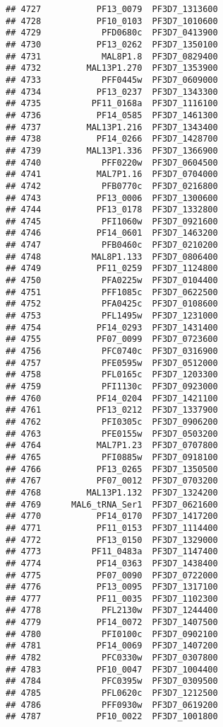 \documentclass[12pt, a4paper]{article}\usepackage[]{graphicx}\usepackage[]{color}
\makeatletter
\newenvironment{kframe}{%
 \def\at@end@of@kframe{}%
 \ifinner\ifhmode%
  \def\at@end@of@kframe{\end{minipage}}%
  \begin{minipage}{\columnwidth}%
 \fi\fi%
 \def\FrameCommand##1{\hskip\@totalleftmargin \hskip-\fboxsep
 \colorbox{shadecolor}{##1}\hskip-\fboxsep
     \hskip-\linewidth \hskip-\@totalleftmargin \hskip\columnwidth}%
 \MakeFramed {\advance\hsize-\width
   \@totalleftmargin\z@ \linewidth\hsize
   \@setminipage}}%
 {\par\unskip\endMakeFramed%
 \at@end@of@kframe}
\newenvironment{knitrout}{}{} %
\makeatother
\begin{document}
\begin{knitrout}
\begin{kframe}
\begin{verbatim}
## 4727           PF13_0079  PF3D7_1313600
## 4728           PF10_0103  PF3D7_1010600
## 4729            PFD0680c  PF3D7_0413900
## 4730           PF13_0262  PF3D7_1350100
## 4731            MAL8P1.8  PF3D7_0829400
## 4732         MAL13P1.270  PF3D7_1353900
## 4733            PFF0445w  PF3D7_0609000
## 4734           PF13_0237  PF3D7_1343300
## 4735          PF11_0168a  PF3D7_1116100
## 4736           PF14_0585  PF3D7_1461300
## 4737         MAL13P1.216  PF3D7_1343400
## 4738           PF14_0266  PF3D7_1428700
## 4739         MAL13P1.336  PF3D7_1366900
## 4740            PFF0220w  PF3D7_0604500
## 4741           MAL7P1.16  PF3D7_0704000
## 4742            PFB0770c  PF3D7_0216800
## 4743           PF13_0006  PF3D7_1300600
## 4744           PF13_0178  PF3D7_1332800
## 4745            PFI1060w  PF3D7_0921600
## 4746           PF14_0601  PF3D7_1463200
## 4747            PFB0460c  PF3D7_0210200
## 4748          MAL8P1.133  PF3D7_0806400
## 4749           PF11_0259  PF3D7_1124800
## 4750            PFA0225w  PF3D7_0104400
## 4751            PFF1085c  PF3D7_0622500
## 4752            PFA0425c  PF3D7_0108600
## 4753            PFL1495w  PF3D7_1231000
## 4754           PF14_0293  PF3D7_1431400
## 4755           PF07_0099  PF3D7_0723600
## 4756            PFC0740c  PF3D7_0316900
## 4757            PFE0595w  PF3D7_0512000
## 4758            PFL0165c  PF3D7_1203300
## 4759            PFI1130c  PF3D7_0923000
## 4760           PF14_0204  PF3D7_1421100
## 4761           PF13_0212  PF3D7_1337900
## 4762            PFI0305c  PF3D7_0906200
## 4763            PFE0155w  PF3D7_0503200
## 4764           MAL7P1.23  PF3D7_0707800
## 4765            PFI0885w  PF3D7_0918100
## 4766           PF13_0265  PF3D7_1350500
## 4767           PF07_0012  PF3D7_0703200
## 4768         MAL13P1.132  PF3D7_1324200
## 4769      MAL6_tRNA_Ser1  PF3D7_0621600
## 4770           PF14_0170  PF3D7_1417200
## 4771           PF11_0153  PF3D7_1114400
## 4772           PF13_0150  PF3D7_1329000
## 4773          PF11_0483a  PF3D7_1147400
## 4774           PF14_0363  PF3D7_1438400
## 4775           PF07_0090  PF3D7_0722000
## 4776           PF13_0095  PF3D7_1317100
## 4777           PF11_0035  PF3D7_1102300
## 4778            PFL2130w  PF3D7_1244400
## 4779           PF14_0072  PF3D7_1407500
## 4780            PFI0100c  PF3D7_0902100
## 4781           PF14_0069  PF3D7_1407200
## 4782            PFC0330w  PF3D7_0307800
## 4783           PF10_0047  PF3D7_1004400
## 4784            PFC0395w  PF3D7_0309500
## 4785            PFL0620c  PF3D7_1212500
## 4786            PFF0930w  PF3D7_0619200
## 4787           PF10_0022  PF3D7_1001800

\end{verbatim}
\end{kframe}
\end{knitrout}
\end{document}
